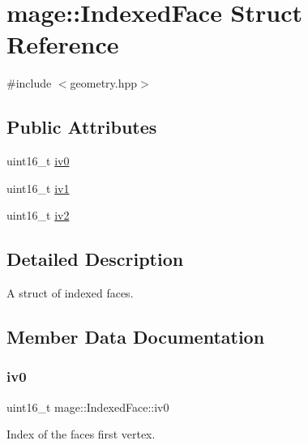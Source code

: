 \hypertarget{structmage_1_1_indexed_face}{}\section{mage\+:\+:Indexed\+Face Struct Reference}
\label{structmage_1_1_indexed_face}


{\ttfamily \#include $<$geometry.\+hpp$>$}

\subsection*{Public Attributes}
\begin{DoxyCompactItemize}
\item 
uint16\+\_\+t \hyperlink{structmage_1_1_indexed_face_a26f197abbbe88a457f3e8666a6860f77}{iv0}
\item 
uint16\+\_\+t \hyperlink{structmage_1_1_indexed_face_a4d68d25c6af658d77e485df16136495d}{iv1}
\item 
uint16\+\_\+t \hyperlink{structmage_1_1_indexed_face_ae0e96f9c46f47c7d02da18eb04f497ff}{iv2}
\end{DoxyCompactItemize}


\subsection{Detailed Description}
A struct of indexed faces. 

\subsection{Member Data Documentation}
\hypertarget{structmage_1_1_indexed_face_a26f197abbbe88a457f3e8666a6860f77}{}\label{structmage_1_1_indexed_face_a26f197abbbe88a457f3e8666a6860f77} 
\subsubsection{\texorpdfstring{iv0}{iv0}}
{\footnotesize\ttfamily uint16\+\_\+t mage\+::\+Indexed\+Face\+::iv0}

Index of the face\textquotesingle{}s first vertex. \hypertarget{structmage_1_1_indexed_face_a4d68d25c6af658d77e485df16136495d}{}\label{structmage_1_1_indexed_face_a4d68d25c6af658d77e485df16136495d} 
